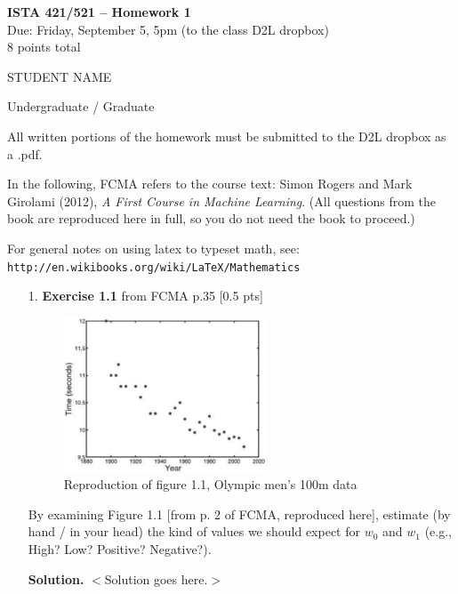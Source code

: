 \documentclass[10pt]{article}
\begin{document}
\begin{center}
    {\Large {\bf ISTA 421/521 -- Homework 1}} \\
    Due: Friday, September 5, 5pm (to the class D2L dropbox) \\
    8 points total
\end{center}

\begin{flushright}
STUDENT NAME  %

Undergraduate / Graduate %
\end{flushright}

\vspace{1cm}
All written portions of the homework must be submitted to the D2L dropbox as a .pdf.

In the following, FCMA refers to the course text: Simon Rogers and Mark Girolami (2012), {\em A First Course in Machine Learning}.  (All questions from the book are reproduced here in full, so you do not need the book to proceed.)

For general notes on using latex to typeset math, see: {\tt http://en.wikibooks.org/wiki/LaTeX/Mathematics}
\vspace{.5cm}


\begin{enumerate}

\item[1.]
{\bf Exercise 1.1} from FCMA p.35 [0.5 pts]

\begin{figure}[htb]
\begin{center}
\includegraphics[width=6cm]{figs/figure1-1_p2}
\caption{Reproduction of figure 1.1, Olympic men's 100m data}
\end{center}
\end{figure}
By examining Figure 1.1 [from p. 2 of FCMA, reproduced here], estimate (by hand / in your head) the kind of values we should expect for $w_0$ and $w_1$ (e.g., High? Low?  Positive?  Negative?).

{\bf Solution.} $<$Solution goes here.$>$

\end{enumerate}
\end{document}

